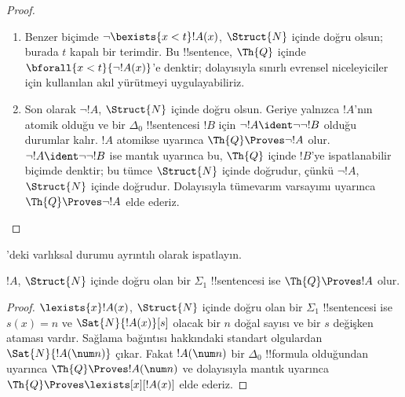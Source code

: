 \documentclass[../../../include/open-logic-section]{subfiles}
\begin{document}
\begin{proof}
\begin{enumerate}
dolayısıyla sınırlı varlıksal niceleyiciler için kullanılan akıl yürütmeyi
uygulayabiliriz.
%
\item Benzer biçimde $\lnot\bexists{x<t}!A(x)$, $\Struct{N}$ içinde doğru
olsun; burada $t$ kapalı bir terimdir. Bu !!{sentence}, $\Th{Q}$ içinde
$\bforall{x<t}{\lnot !A(x)}$'e denktir; dolayısıyla sınırlı evrensel
niceleyiciler için kullanılan akıl yürütmeyi uygulayabiliriz.
%
\item Son olarak $\lnot !A$, $\Struct{N}$ içinde doğru olsun. Geriye yalnızca
$!A$'nın atomik olduğu ve bir $\Delta_0$ !!{sentence}{}si $!B$ için
$\lnot !A\ident\lnot\lnot !B$ olduğu durumlar kalır. $!A$ atomikse
 uyarınca $\Th{Q} \Proves \lnot !A$ olur.
$\lnot !A\ident\lnot\lnot !B$ ise mantık uyarınca bu, $\Th{Q}$ içinde
$!B$'ye ispatlanabilir biçimde denktir; bu tümce $\Struct{N}$ içinde
doğrudur, çünkü $\lnot !A$, $\Struct{N}$ içinde doğrudur. Dolayısıyla tümevarım varsayımı
uyarınca $\Th{Q} \Proves \lnot !A$ elde ederiz.
\end{enumerate}
\end{proof}

\begin{prob}
'deki varlıksal durumu ayrıntılı olarak
ispatlayın.
\end{prob}

\begin{thm}
$!A$, $\Struct{N}$ içinde doğru olan bir $\Sigma_1$ !!{sentence}{}si ise
$\Th{Q} \Proves !A$ olur.
\end{thm}

\begin{proof}
$\lexists{x}!A(x)$, $\Struct{N}$ içinde doğru olan bir $\Sigma_1$
!!{sentence}{}si ise $s(x)=n$ ve $\Sat{N}{!A(x)}[s]$ olacak bir $n$ doğal
sayısı ve bir $s$ değişken ataması vardır. Sağlama bağıntısı hakkındaki
standart olgulardan $\Sat{N}{!A(\num n)}$ çıkar. Fakat $!A(\num n)$ bir
$\Delta_0$ !!{formula} olduğundan  uyarınca
$\Th{Q} \Proves !A(\num n)$ ve dolayısıyla mantık uyarınca
$\Th{Q} \Proves \lexists[x][!A(x)]$ elde ederiz.
\end{proof}
\end{document}
